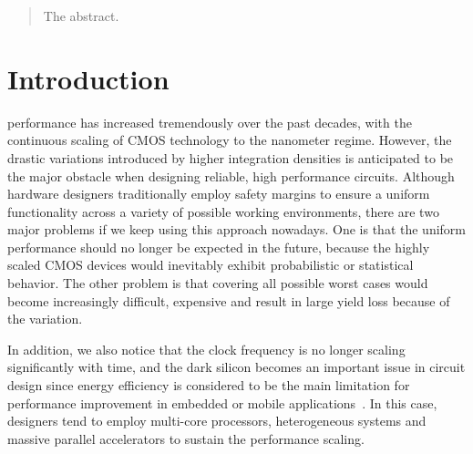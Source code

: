 \documentclass[journal]{IEEEtran}
\begin{document}
\begin{abstract}
The abstract.
\end{abstract}

\begin{IEEEkeywords}

\end{IEEEkeywords}


%
\IEEEpeerreviewmaketitle



\section{Introduction}
 performance has increased tremendously over the past decades, with the continuous scaling of CMOS technology to the nanometer regime. However, the drastic variations introduced by higher integration densities is anticipated to be the major obstacle when designing reliable, high performance circuits. Although hardware designers traditionally employ safety margins to ensure a uniform functionality across a variety of possible working environments, there are two major problems if we keep using this approach nowadays. One is that the uniform performance should no longer be expected in the future, because the highly scaled CMOS devices would inevitably exhibit probabilistic or statistical behavior. The other problem is that covering all possible worst cases would become increasingly difficult, expensive and result in large yield loss because of the variation.

In addition, we also notice that the clock frequency is no longer scaling significantly with time, and the dark silicon becomes an important issue in circuit design since energy efficiency is considered to be the main limitation for performance improvement in embedded or mobile applications~\cite{FutureMicroprocessor2005,DarkSilicon2011}. In this case, designers tend to employ multi-core processors, heterogeneous systems and massive parallel accelerators to sustain the performance scaling.
\end{document}
